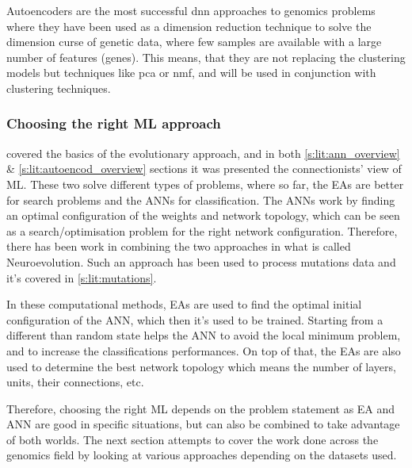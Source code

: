 Autoencoders are the most successful \acrshort{dnn} approaches to genomics problems where they have been used as a dimension reduction technique to solve the dimension curse of genetic data, where few samples are available with a large number of features (genes). This means, that they are not replacing the clustering models but techniques like \acrfull{pca} or \acrfull{nmf}, and will be used in conjunction with clustering techniques.




\subsubsection{Choosing the right ML approach} \label{s:lit:neuroevolution}

 covered the basics of the evolutionary approach, and in both \ref{s:lit:ann_overview} \& \ref{s:lit:autoencod_overview} sections it was presented the connectionists' view of ML. These two solve different types of problems, where so far, the EAs are better for search problems and the ANNs for classification. The ANNs work by finding an optimal configuration of the weights and network topology, which can be seen as a search/optimisation problem for the right network configuration. Therefore, there has been work in combining the two approaches in what is called Neuroevolution. Such an approach has been used to process mutations data and it's covered in \cref{s:lit:mutations}.

In these computational methods, EAs are used to find the optimal initial configuration of the ANN, which then it's used to be trained. Starting from a different than random state helps the ANN to avoid the local minimum problem, and to increase the classifications performances. On top of that, the EAs are also used to determine the best network topology which means the number of layers, units, their connections, etc.

Therefore, choosing the right ML depends on the problem statement as EA and ANN are good in specific situations, but can also be combined to take advantage of both worlds. The next section attempts to cover the work done across the genomics field by looking at various approaches depending on the datasets used.






